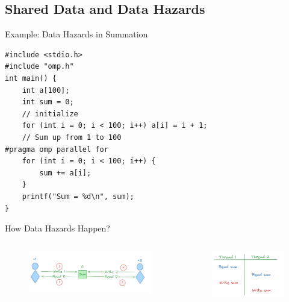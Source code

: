 \subsection{Shared Data and Data Hazards}

\begin{frame}[fragile]{Example: Data Hazards in Summation}
\begin{verbatim}
#include <stdio.h>
#include "omp.h"
int main() {
    int a[100];
    int sum = 0;
    // initialize
    for (int i = 0; i < 100; i++) a[i] = i + 1;
    // Sum up from 1 to 100
#pragma omp parallel for
    for (int i = 0; i < 100; i++) {
        sum += a[i];
    }
    printf("Sum = %d\n", sum);
}
\end{verbatim}
\end{frame}

\begin{frame}[fragile]{How Data Hazards Happen?}
\begin{columns}[T]
    \begin{column}{0.7\textwidth}
        \begin{figure}
            \centering
            \includegraphics[width=\textwidth]{day8_am/img/hazard_illustration.png}
        \end{figure}
    \end{column}
    \begin{column}{0.3\textwidth}
        \begin{figure}
            \centering
            \includegraphics[width=\textwidth]{day8_am/img/hazard_schedule.png}
        \end{figure}
    \end{column}
\end{columns}
\end{frame}

